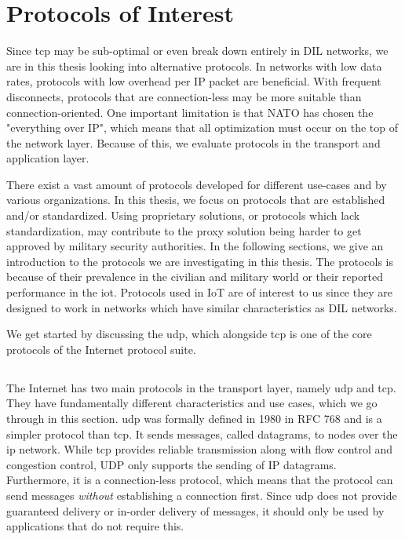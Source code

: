 \section{Protocols of Interest}

Since \gls{tcp} may be sub-optimal or even break down entirely in DIL networks,
we are in this thesis looking into alternative protocols. In networks with low
data rates, protocols with low overhead per IP packet are beneficial. With
frequent disconnects, protocols that are connection-less may be more suitable
than connection-oriented. One important limitation is that NATO has chosen the
"everything over IP", which means that all optimization must occur on the top of
the network layer. Because of this, we evaluate protocols in the transport and
application layer.

There exist a vast amount of protocols developed for different use-cases and by
various organizations. In this thesis, we focus on protocols that are
established and/or standardized. Using proprietary solutions, or protocols which
lack standardization, may contribute to the proxy solution being harder to get
approved by military security authorities. In the following sections, we give an
introduction to the protocols we are investigating in this thesis. The protocols
is because of their prevalence in the civilian and military world or their
reported performance in the \gls{iot}. Protocols used in IoT are of interest to
us since they are designed to work in networks which have similar
characteristics as DIL networks.

We get started by discussing the \gls{udp}, which alongside \gls{tcp} is one of
the core protocols of the Internet protocol suite.


\subsection{}

The Internet has two main protocols in the transport layer, namely \gls{udp} and
\gls{tcp}. They have fundamentally different characteristics and use cases,
which we go through in this section. \gls{udp} was formally defined in 1980 in
RFC 768\cite{rfc-udp} and is a simpler protocol than \gls{tcp}. It sends
messages, called datagrams, to nodes over the \gls{ip} network. While \gls{tcp}
provides reliable transmission along with flow control and congestion control,
UDP only supports the sending of IP datagrams. Furthermore, it is a
connection-less protocol, which means that the protocol can send messages
\textit{without} establishing a connection first. Since \gls{udp} does not
provide guaranteed delivery or in-order delivery of messages, it should only be
used by applications that do not require this.

